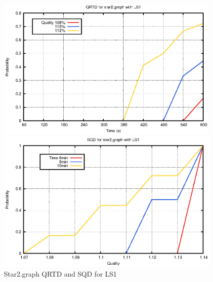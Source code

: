 \begin{figure}[H]
\centering
\caption{Star2.graph QRTD and SQD for LS1}
\begin{minipage}[b]{0.4\textwidth}
\includegraphics[height=7cm]{../graph/star2-QRTD-LS1.eps}
\end{minipage}
\hspace{0.6in}
\begin{minipage}[b]{0.4\textwidth}
\centering
\includegraphics[height=7cm]{../graph/star2-SQD-LS1.eps}
\end{minipage}
\end{figure}

